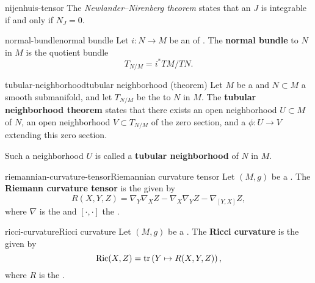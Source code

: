 \begin{example}{nijenhuis-tensor}
    The \textit{Newlander–Nirenberg theorem} states that an  $J$ is integrable if and only if $N_J = 0$.
\end{example}

\begin{topic}{normal-bundle}{normal bundle}
    Let $i \colon N \to M$ be an  of . The \textbf{normal bundle} to $N$ in $M$ is the quotient bundle
    \[ T_{N/M} = i^* TM / TN . \]
\end{topic}

\begin{topic}{tubular-neighborhood}{tubular neighborhood (theorem)}
    Let $M$ be a  and $N \subset M$ a smooth submanifold, and let $T_{N/M}$ be the  to $N$ in $M$. The \textbf{tubular neighborhood theorem} states that there exists an open neighborhood $U \subset M$ of $N$, an open neighborhood $V \subset T_{N/M}$ of the zero section, and a  $\phi \colon U \to V$ extending this zero section.
    
    Such a neighborhood $U$ is called a \textbf{tubular neighborhood} of $N$ in $M$.
\end{topic}

\begin{topic}{riemannian-curvature-tensor}{Riemannian curvature tensor}
    Let $(M, g)$ be a . The \textbf{Riemann curvature tensor} is the  given by
    \[ R(X, Y, Z) = \nabla_Y \nabla_X Z - \nabla_X \nabla_Y Z - \nabla_{[Y, X]} Z , \]
    where $\nabla$ is the  and $[\cdot, \cdot]$ the .
\end{topic}

\begin{topic}{ricci-curvature}{Ricci curvature}
    Let $(M, g)$ be a . The \textbf{Ricci curvature} is the  given by
    \[ \textup{Ric}(X, Z) = \operatorname{tr} \left( Y \mapsto R(X, Y, Z) \right), \]
    where $R$ is the .
\end{topic}

